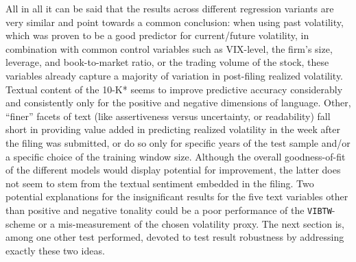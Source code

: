 All in all it can be said that the results across different regression variants are very similar and point towards a common conclusion: when using past volatility, which was proven to be a good predictor for current/future volatility, in combination with common control variables such as VIX-level, the firm's size, leverage, and book-to-market ratio, or the trading volume of the stock, these variables already capture a majority of variation in post-filing realized volatility. Textual content of the 10-K* seems to improve predictive accuracy considerably and consistently only for the positive and negative dimensions of language. Other, \enquote{finer} facets of text (like assertiveness versus uncertainty, or readability) fall short in providing value added in predicting realized volatility in the week after the filing was submitted, or do so only for specific years of the test sample and/or a specific choice of the training window size. Although the overall goodness-of-fit of the different models would display potential for improvement, the latter does not seem to stem from the textual sentiment embedded in the filing. Two potential explanations for the insignificant results for the five text variables other than positive and negative tonality could be a poor performance of the \texttt{VIBTW}-scheme or a mis-measurement of the chosen volatility proxy. The next section is, among one other test performed, devoted to test result robustness by addressing exactly these two ideas.

\clearpage